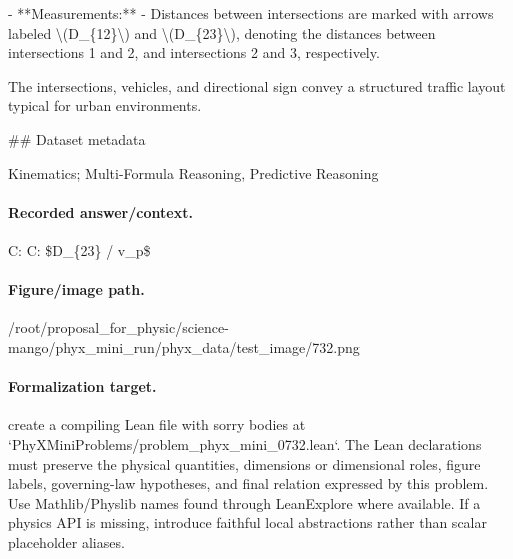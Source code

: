 - **Measurements:**
  - Distances between intersections are marked with arrows labeled \textbackslash{}(D\_\{12\}\textbackslash{}) and \textbackslash{}(D\_\{23\}\textbackslash{}), denoting the distances between intersections 1 and 2, and intersections 2 and 3, respectively.

The intersections, vehicles, and directional sign convey a structured traffic layout typical for urban environments.

\#\# Dataset metadata

Kinematics; Multi-Formula Reasoning, Predictive Reasoning

\paragraph{Recorded answer/context.}
C: C: \$D\_\{23\} / v\_p\$

\paragraph{Figure/image path.}
/root/proposal\_for\_physic/science-mango/phyx\_mini\_run/phyx\_data/test\_image/732.png

\paragraph{Formalization target.}
create a compiling Lean file with sorry bodies at `PhyXMiniProblems/problem\_phyx\_mini\_0732.lean`. The Lean declarations must preserve the physical quantities, dimensions or dimensional roles, figure labels, governing-law hypotheses, and final relation expressed by this problem.
Use Mathlib/Physlib names found through LeanExplore where available. If a physics API is missing, introduce faithful local abstractions rather than scalar placeholder aliases.

